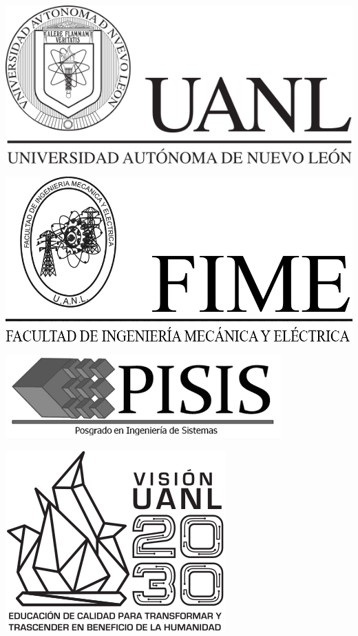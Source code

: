 \documentclass[15pt,a4paper]{scrartcl}
\begin{document}
	\thispagestyle{empty}
	
	\noindent
	\begin{minipage}[c]{0.1\textwidth}
		\begin{center}
		\includegraphics[scale=0.25]{uanl_logo.png}
		
		\vspace{2cm}
		\includegraphics[scale=0.15]{fime_footer_gris.png}
		
		\vspace{2.5cm}
		\includegraphics[scale=0.3]{pisis_gris.png}
		
		\vspace{2.5cm}
		\includegraphics[scale=0.3]{uanl_vision.png}
		\end{center}
	\end{minipage}
\end{document}

